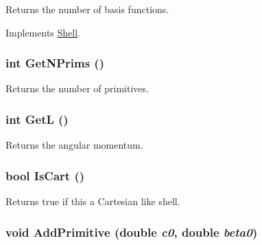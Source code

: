 Returns the number of basis functions. 

Implements \hyperlink{classJKBuilder_1_1Shell_a1167cdb6f1e1ba08ba6cbffa0b32ca77}{Shell}.\hypertarget{classJKBuilder_1_1Shell_abc886cd4e35d3c56a0250b7d06986f61}{
\subsubsection[{GetNPrims}]{\setlength{\rightskip}{0pt plus 5cm}int GetNPrims ()}}
\label{classJKBuilder_1_1Shell_abc886cd4e35d3c56a0250b7d06986f61}


Returns the number of primitives. \hypertarget{classJKBuilder_1_1Shell_a7cc8fc5bc043267a7b47e69503e0e308}{
\subsubsection[{GetL}]{\setlength{\rightskip}{0pt plus 5cm}int GetL ()}}
\label{classJKBuilder_1_1Shell_a7cc8fc5bc043267a7b47e69503e0e308}


Returns the angular momentum. \hypertarget{classJKBuilder_1_1Shell_a75c22d97e837f5c439eb51aa223bed98}{
\subsubsection[{IsCart}]{\setlength{\rightskip}{0pt plus 5cm}bool IsCart ()}}
\label{classJKBuilder_1_1Shell_a75c22d97e837f5c439eb51aa223bed98}


Returns true if this a Cartesian like shell. \hypertarget{classJKBuilder_1_1Shell_a20ec923cb07d5d3762fffa4501d09924}{
\subsubsection[{AddPrimitive}]{\setlength{\rightskip}{0pt plus 5cm}void AddPrimitive (double {\em c0}, \/  double {\em beta0})}}
\label{classJKBuilder_1_1Shell_a20ec923cb07d5d3762fffa4501d09924}


